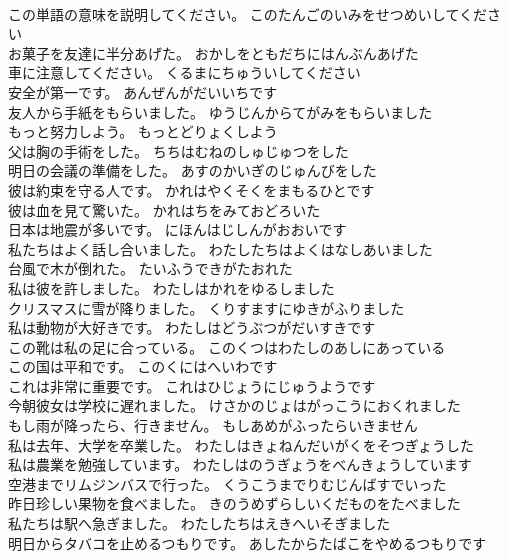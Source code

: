 \documentclass[8pt]{extreport}
\begin{document}
\begin{CJK}{UTF8}{min}
\\	この単語の意味を説明してください。	このたんごのいみをせつめいしてください 
\\	お菓子を友達に半分あげた。	おかしをともだちにはんぶんあげた 
\\	車に注意してください。	くるまにちゅういしてください 
\\	安全が第一です。	あんぜんがだいいちです 
\\	友人から手紙をもらいました。	ゆうじんからてがみをもらいました 
\\	もっと努力しよう。	もっとどりょくしよう 
\\	父は胸の手術をした。	ちちはむねのしゅじゅつをした 
\\	明日の会議の準備をした。	あすのかいぎのじゅんびをした 
\\	彼は約束を守る人です。	かれはやくそくをまもるひとです 
\\	彼は血を見て驚いた。	かれはちをみておどろいた 
\\	日本は地震が多いです。	にほんはじしんがおおいです 
\\	私たちはよく話し合いました。	わたしたちはよくはなしあいました 
\\	台風で木が倒れた。	たいふうできがたおれた 
\\	私は彼を許しました。	わたしはかれをゆるしました 
\\	クリスマスに雪が降りました。	くりすますにゆきがふりました 
\\	私は動物が大好きです。	わたしはどうぶつがだいすきです 
\\	この靴は私の足に合っている。	このくつはわたしのあしにあっている 
\\	この国は平和です。	このくにはへいわです 
\\	これは非常に重要です。	これはひじょうにじゅうようです 
\\	今朝彼女は学校に遅れました。	けさかのじょはがっこうにおくれました 
\\	もし雨が降ったら、行きません。	もしあめがふったらいきません 
\\	私は去年、大学を卒業した。	わたしはきょねんだいがくをそつぎょうした 
\\	私は農業を勉強しています。	わたしはのうぎょうをべんきょうしています 
\\	空港までリムジンバスで行った。	くうこうまでりむじんばすでいった 
\\	昨日珍しい果物を食べました。	きのうめずらしいくだものをたべました 
\\	私たちは駅へ急ぎました。	わたしたちはえきへいそぎました 
\\	明日からタバコを止めるつもりです。	あしたからたばこをやめるつもりです 

\end{CJK}
\end{document}
